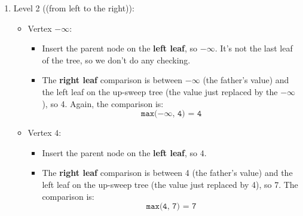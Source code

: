 \begin{itemize}
\begin{itemize}
\begin{enumerate}
\begin{examplebox}
\begin{enumerate}
\begin{center}
                    \end{center}
                    \newpage
                    \item Level 2 ((from left to the right)):
                    \begin{itemize}
                        \item Vertex $-\infty$:
                        \begin{itemize}
                            \item Insert the parent node on the \textbf{left leaf}, so $-\infty$. It's not the last leaf of the tree, so we don't do any checking.

                            \item The \textbf{right leaf} comparison is between $-\infty$ (the father's value) and the left leaf on the up-sweep tree (the value just replaced by the $-\infty$), so 4. Again, the comparison is:
                            \begin{equation*}
                                \texttt{max($-\infty$, 4) = 4}
                            \end{equation*}
                        \end{itemize}

                        \item Vertex $4$:
                        \begin{itemize}
                            \item Insert the parent node on the \textbf{left leaf}, so $4$.
                            \item The \textbf{right leaf} comparison is between 4 (the father's value) and the left leaf on the up-sweep tree (the value just replaced by 4), so 7. The comparison is:
                            \begin{equation*}
                                \texttt{max(4, 7) = 7}
                            \end{equation*}
                        \end{itemize}
                    \end{itemize}
                    \begin{center}
                        \begin{tikzpicture}
                            [level distance=14mm,
                             level 1/.style={sibling distance=40mm},
                             level 2/.style={sibling distance=20mm},
                             level 3/.style={sibling distance=10mm},
                             every node/.style={draw, circle, minimum size=8mm, inner sep=0pt},
                             edge from parent/.style={draw, -{Stealth}}]
    

\end{tikzpicture}
\end{center}
\end{enumerate}
\end{examplebox}
\end{enumerate}
\end{itemize}
\end{itemize}
